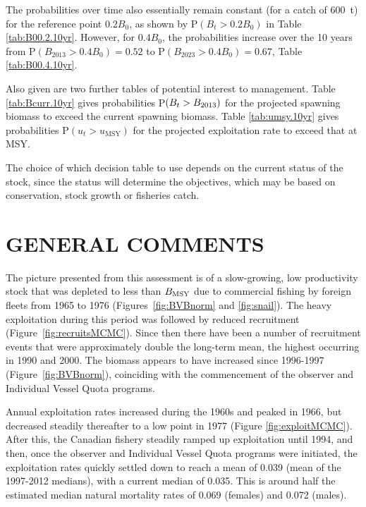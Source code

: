 The probabilities over time also essentially remain constant (for a catch of 600~t) for the reference point $0.2 B_0$, as shown by P$(B_{t} > 0.2 B_0)$ in Table \ref{tab:B00.2.10yr}. However, for $0.4 B_0$, the probabilities increase over the 10 years from P$(B_{2013} > 0.4 B_0)=0.52$ to P$(B_{2023} > 0.4 B_0)=0.67$, Table \ref{tab:B00.4.10yr}. 

Also given are two further tables of potential interest to management. Table \ref{tab:Bcurr.10yr} gives probabilities P$(B_t > B_{2013})$ for the projected spawning biomass to exceed the current spawning biomass. Table \ref{tab:umsy.10yr} gives probabilities P$(u_t > u_\mathrm{MSY})$ for the projected exploitation rate to exceed that at MSY.

The choice of which decision table to use depends on the current status of the stock, since the status will determine the objectives, which may be based on conservation, stock growth or fisheries catch. 

\vspace{10mm}     %
\section{GENERAL COMMENTS}

The picture presented from this assessment is of a slow-growing, low productivity stock that was depleted to less than $B_\mathrm{MSY}$ due to commercial fishing by foreign fleets from 1965 to 1976 (Figures~\ref{fig:BVBnorm} and \ref{fig:snail}). The heavy exploitation during this period was followed by reduced recruitment (Figure~\ref{fig:recruitsMCMC}). Since then there have been a number of recruitment events that were approximately double the long-term mean, the highest occurring in 1990 and 2000. The biomass appears to have increased since 1996-1997 (Figure~\ref{fig:BVBnorm}), coinciding with the commencement of the observer and Individual Vessel Quota programs.

Annual exploitation rates increased during the 1960s and peaked in 1966, but decreased steadily thereafter to a low point in 1977 (Figure \ref{fig:exploitMCMC}). After this, the Canadian fishery steadily ramped up exploitation until 1994, and then, once the observer and Individual Vessel Quota programs were initiated, the exploitation rates quickly settled down to reach a mean of 0.039 (mean of the 1997-2012 medians), with a current median of 0.035. This is around half the estimated median natural mortality rates of 0.069 (females) and 0.072 (males).

